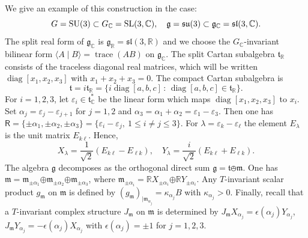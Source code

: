 \documentclass[a4paper,reqno]{amsart}
\theoremstyle{definition}
\theoremstyle{remark}
\theoremstyle{plain}
\numberwithin{equation}{section}
\newcommand{\C}{{\mathbb{C}}}
\newcommand{\R}{{\mathbb{R}}}
\newcommand{\g}{{\mathfrak{g}}}  %
\newcommand{\fm}{{\mathfrak{m}}}
\newcommand{\fsl}{{\mathfrak{sl}}}
\newcommand{\ft}{{\mathfrak{t}}}
\def\SL{\operatorname {SL}}
\def\SU{\operatorname {SU}}
\def\diag{\operatorname {diag}}
\DeclareMathOperator{\trace}{{trace}}
\def\boplus{\mathbin{\boldsymbol{\oplus}}}
\newcommand{\ascal}[2]{{\langle {#1}  \mid {#2} \rangle}}
\newcommand{\vepsilon}{\varepsilon}
\newcommand{\roots}{\mathsf{R}}
\begin{document}
We give an example of this construction in the case:
 \[
 G = \SU(3) \subset G_\C= \SL(3,\C), \quad \g= \su(3) \subset \g_\C=\fsl(3,\C).
 \]
 The split real form of $\g_\C$ is $\g_\R = \fsl(3,\R)$ and we
 choose the $G_\C$-invariant bilinear form
 $\ascal{A}{B} = \trace(AB)$ on $\g_\C$.  The split Cartan
 subalgebra $\ft_\R$ consists of the traceless diagonal real
 matrices, which will be written $\diag[x_1,x_2,x_3]$ with
 $x_1+x_2+x_3= 0$.  The compact Cartan subalgebra is
\[
\ft = i\ft_\R = \{i\diag[a,b,c] \, : \, \diag[a,b,c] \in \ft_\R\}.
\]
For $i=1,2,3$, let $\vepsilon_i \in \ft_\C^*$ be the linear form
which maps $\diag[x_1,x_2,x_3]$ to $x_i$. Set $\alpha_j=
\vepsilon_{j} - \vepsilon_{j+1}$ for $j=1,2$ and $\alpha_3 =
\alpha_1 + \alpha_2= \vepsilon_1 - \vepsilon_3$. Then 
one has 
$ \roots = \{\pm \alpha_1, \pm \alpha_2, \pm
  \alpha_3\} = \{\vepsilon_i - \vepsilon_j, \ 1 \le  i \neq j \le 3\}$.
  For
$\lambda = \vepsilon_k - \vepsilon_\ell$ the element $E_\lambda$
is the unit matrix $E_{k\ell}$.  Hence,
\begin{equation*} \label{eq5.0}
  X_\lambda = \frac{1}{\sqrt{2}} (E_{k\ell} - E_{\ell k}) , \quad
  Y_\lambda = \frac{i}{\sqrt{2}}(E_{k\ell} + E_{\ell k}).
\end{equation*}
The algebra $\g$ decomposes as the orthogonal direct sum $\g= \ft \obot \fm$. One has
$\fm= \fm_{\pm \alpha_1} \boplus \fm_{\pm \alpha_2} \boplus
\fm_{\pm \alpha_3}$, where
$\fm_{\pm \alpha_i} = \R X_{\pm \alpha_i} \boplus  \R Y_{\pm
  \alpha_i}$.
Any $T$-invariant  scalar product $g_\fm $ on $\fm$ is
defined by ${(g_\fm)}_{\mid \fm_{\alpha_j}} = \kappa_{\alpha_j} B$
with  $\kappa_{\alpha_j} >0$.
Finally, recall that a $T$-invariant complex structure $J_\fm$ on $\fm$
is determined by $J_\fm X_{\alpha_j} = \epsilon(\alpha_j) Y_{\alpha_j}$,
$J_\fm  Y_{\alpha_j} = - \epsilon(\alpha_j) X_{\alpha_j}$ with
$\epsilon(\alpha_j) =\pm 1$ for $j=1,2,3$.
 
\end{document}
